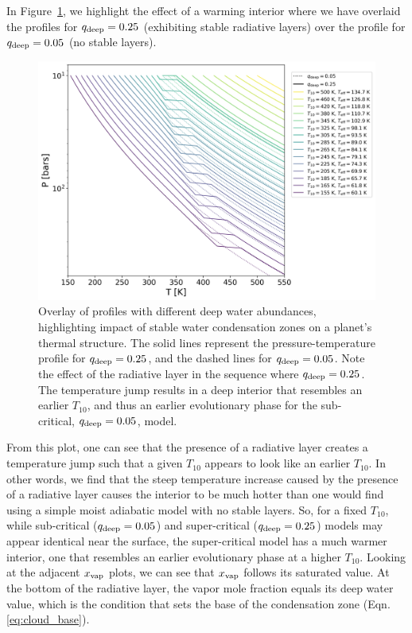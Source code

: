 \documentclass[11pt]{ucscthesisbs}
\begin{document}
In Figure~\ref{fig:overlay}, we highlight the effect of a warming interior where we have overlaid the profiles for $q_{\rm deep} = 0.25$ (exhibiting stable radiative layers) over the profile for $q_{\rm deep}=0.05$ (no stable layers). 
\begin{figure}[h]{}
 \centerline{
  \includegraphics[width=\columnwidth]{figures/thesis_static_radiative_layer_plot_diff_qdeep_overlay.png}
 }
\caption[Impact of Radiative Layer on $T_{10}$]
{Overlay of profiles with different deep water abundances, highlighting impact of stable water condensation zones on a planet's thermal structure. The solid lines represent the pressure-temperature profile for $q_{\rm deep} = 0.25$, and the dashed lines for $q_{\rm deep}=0.05$. Note the effect of the radiative layer in the sequence where $q_{\rm deep} = 0.25$. The temperature jump results in a deep interior that resembles an earlier $T_{10}$, and thus an earlier evolutionary phase for the sub-critical, $q_{\rm deep} = 0.05$, model.}
\label{fig:overlay}
\end{figure}
From this plot, one can see that the presence of a radiative layer creates a temperature jump such that a given $T_{10}$ appears to look like an earlier $T_{10}$. In other words, we find that the steep temperature increase caused by the presence of a radiative layer causes the interior to be much hotter than one would find using a simple moist adiabatic model with no stable layers. So, for a fixed $T_{10}$, while sub-critical ($q_{\rm deep} = 0.05$) and super-critical ($q_{\rm deep} = 0.25$) models may appear identical near the surface, the super-critical model has a much warmer interior, one that resembles an earlier evolutionary phase at a higher $T_{10}$. Looking at the adjacent $x_{\rm vap}$ plots, we can see that $x_{\rm vap}$ follows its saturated value. At the bottom of the radiative layer, the vapor mole fraction equals its deep water value, which is the condition that sets the base of the condensation zone (Eqn. \ref{eq:cloud_base}). 
\end{document}
